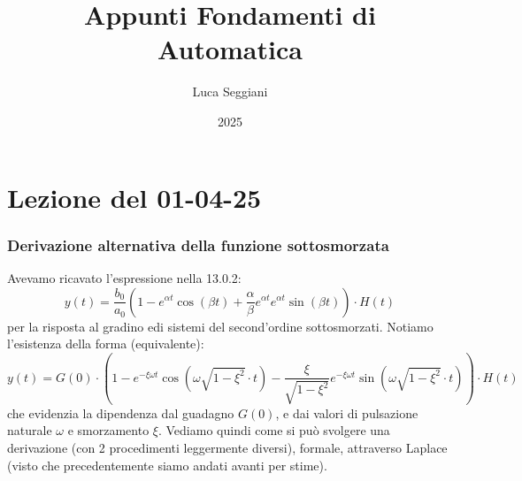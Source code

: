 \documentclass[a4paper,11pt]{article}
\title{Appunti Fondamenti di Automatica}
\author{Luca Seggiani}
\date{2025}
\begin{document}
\section{Lezione del 01-04-25}

\thispagestyle{empty}
\pagestyle{fancy}

\subsubsection{Derivazione alternativa della funzione sottosmorzata}
Avevamo ricavato l'espressione nella 13.0.2:
$$
y(t) = \frac{b_0}{a_0} \left( 1 - e^{\alpha t} \cos(\beta t) + \frac{\alpha}{\beta} e^{\alpha t} e^{\alpha t} \sin(\beta t) \right) \cdot H(t)
$$
per la risposta al gradino edi sistemi del second'ordine sottosmorzati.
Notiamo l'esistenza della forma (equivalente):
$$
y(t) = G(0) \cdot \left( 1 - e^{-\xi \omega t} \cos\left(\omega \sqrt{1 - \xi ^2} \cdot t \right) - \frac{\xi}{\sqrt{1 - \xi^2}} e^{-\xi \omega t} \sin\left( \omega \sqrt{1 - \xi^2} \cdot t \right) \right) \cdot H(t)
$$
che evidenzia la dipendenza dal guadagno $G(0)$, e dai valori di pulsazione naturale $\omega$ e smorzamento $\xi$.
Vediamo quindi come si può svolgere una derivazione (con 2 procedimenti leggermente diversi), formale, attraverso Laplace (visto che precedentemente siamo andati avanti per stime).
\end{document}
